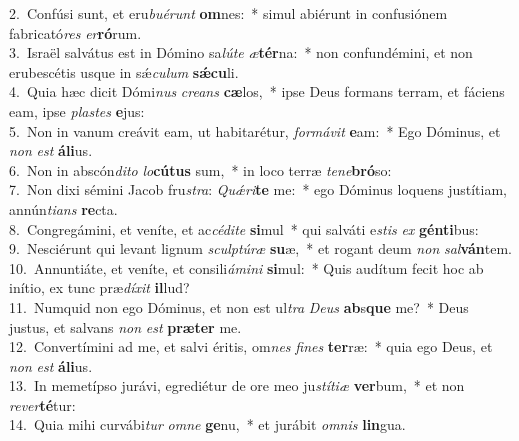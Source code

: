 {2.~}Confúsi sunt, et eru\textit{bu}\textit{é}\textit{runt} \textbf{om}nes:~* simul abiérunt in confusiónem fabricató\textit{res} \textit{er}\textbf{ró}rum.\\
{3.~}Israël salvátus est in Dómino sa\textit{lú}\textit{te} \textit{æ}\textbf{tér}na:~* non confundémini, et non erubescétis usque in sǽ\textit{cu}\textit{lum} \textbf{sǽ}\textbf{cu}li.\\
{4.~}Quia hæc dicit Dómi\textit{nus} \textit{cre}\textit{ans} \textbf{cæ}los,~* ipse Deus formans terram, et fáciens eam, ipse \textit{pla}\textit{stes} \textbf{e}jus:\\
{5.~}Non in vanum creávit eam, ut habitarétur, \textit{for}\textit{má}\textit{vit} \textbf{e}am:~* Ego Dóminus, et \textit{non} \textit{est} \textbf{á}\textbf{li}us.\\
{6.~}Non in abscón\textit{di}\textit{to} \textit{lo}\textbf{cú}\textbf{tus} sum,~* in loco terræ \textit{te}\textit{ne}\textbf{bró}so:\\
{7.~}Non dixi sémini Jacob fru\textit{stra}: \textit{Quǽ}\textit{ri}\textbf{te} me:~* ego Dóminus loquens justítiam, annún\textit{ti}\textit{ans} \textbf{re}cta.\\
{8.~}Congregámini, et veníte, et ac\textit{cé}\textit{di}\textit{te} \textbf{si}mul~* qui salváti e\textit{stis} \textit{ex} \textbf{gén}\textbf{ti}bus:\\
{9.~}Nesciérunt qui levant lignum \textit{scul}\textit{ptú}\textit{ræ} \textbf{su}æ,~* et rogant deum \textit{non} \textit{sal}\textbf{ván}tem.\\
{10.~}Annuntiáte, et veníte, et consili\textit{á}\textit{mi}\textit{ni} \textbf{si}mul:~* Quis audítum fecit hoc ab inítio, ex tunc præ\textit{dí}\textit{xit} \textbf{il}lud?\\
{11.~}Numquid non ego Dóminus, et non est ul\textit{tra} \textit{De}\textit{us} \textbf{ab}s\textbf{que} me?~* Deus justus, et salvans \textit{non} \textit{est} \textbf{præ}\textbf{ter} me.\\
{12.~}Convertímini ad me, et salvi éritis, om\textit{nes} \textit{fi}\textit{nes} \textbf{ter}ræ:~* quia ego Deus, et \textit{non} \textit{est} \textbf{á}\textbf{li}us.\\
{13.~}In memetípso jurávi, egrediétur de ore meo ju\textit{stí}\textit{ti}\textit{æ} \textbf{ver}bum,~* et non \textit{re}\textit{ver}\textbf{té}tur:\\
{14.~}Quia mihi curvábi\textit{tur} \textit{om}\textit{ne} \textbf{ge}nu,~* et jurábit \textit{om}\textit{nis} \textbf{lin}gua.\\

